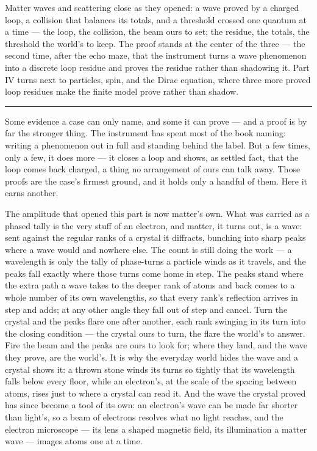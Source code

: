\bigskip

Matter waves and scattering close as they opened: a wave proved by a charged loop, a collision that balances
its totals, and a threshold crossed one quantum at a time --- the loop, the collision, the beam ours to set;
the residue, the totals, the threshold the world's to keep. The proof stands at the center of the three --- the second
time, after the echo maze, that the instrument turns a wave phenomenon into a discrete loop residue and proves
the residue rather than shadowing it. Part IV turns next to particles, spin, and the Dirac equation, where
three more proved loop residues make the finite model prove rather than shadow.

\bigskip
\begin{center}
\rule{0.4\textwidth}{0.4pt}
\end{center}
\bigskip

\noindent Some evidence a case can only name, and some it can prove --- and a proof is by far the stronger
thing. The instrument has spent most of the book naming: writing a phenomenon out in full and standing behind
the label. But a few times, only a few, it does more --- it closes a loop and shows, as settled fact, that the
loop comes back charged, a thing no arrangement of ours can talk away. Those proofs are the case's firmest
ground, and it holds only a handful of them. Here it earns another.

The amplitude that opened this part is now matter's own. What was carried as a phased tally is the very stuff of
an electron, and matter, it turns out, is a wave: sent against the regular ranks of a crystal it diffracts,
bunching into sharp peaks where a wave would and nowhere else. The count is still doing the work --- a
wavelength is only the tally of phase-turns a particle winds as it travels, and the peaks fall exactly where
those turns come home in step. The peaks stand where the extra path a wave takes to the deeper rank of atoms and
back comes to a whole number of its own wavelengths, so that every rank's reflection arrives in step and adds;
at any other angle they fall out of step and cancel. Turn the crystal and the peaks flare one after another,
each rank swinging in its turn into the closing condition --- the crystal ours to turn, the flare the world's to
answer. Fire the beam and the peaks are ours to look for; where they land, and the wave they prove, are the
world's. It is why the everyday world hides the wave and a crystal shows it: a thrown stone winds its turns so
tightly that its wavelength falls below every floor, while an electron's, at the scale of the spacing between
atoms, rises just to where a crystal can read it. And the wave the crystal proved has since become a tool of its
own: an electron's wave can be made far shorter than light's, so a beam of electrons resolves what no light
reaches, and the electron microscope --- its lens a shaped magnetic field, its illumination a matter wave ---
images atoms one at a time.

